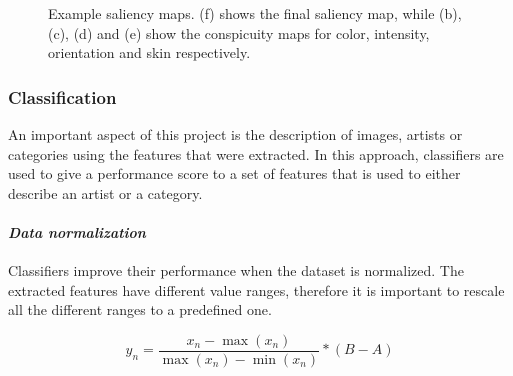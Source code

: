 \begin{figure}[h!]

\caption{Example saliency maps. (f) shows the final saliency map, while (b), (c), (d) and (e) show the conspicuity maps for color, intensity, orientation and skin respectively.}
\end{figure}


\subsubsection{Classification}

An important aspect of this project is the description of images, artists or categories using the features that were extracted.
In this approach, classifiers are used to give a performance score to a set of features that is used to either describe an artist or a category.\\

\paragraph{\textit{Data normalization}}

Classifiers improve their performance when the dataset is normalized.
The extracted features have different value ranges, therefore it is important to rescale all the different ranges to a predefined one.

\begin{equation}
\label{minmax}
y_n=\frac{x_n - \max(x_n)}{\max(x_n)-\min(x_n)} * (B-A)
\end{equation}

